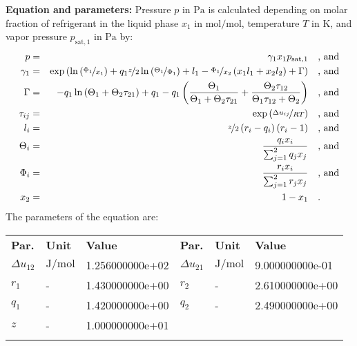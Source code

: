 \textbf{Equation and parameters:}
\newline
%
Pressure $p$ in $\si{\pascal}$ is calculated depending on molar fraction of refrigerant in the liquid phase $x_1$ in $\si{\mole\per\mole}$, temperature $T$ in $\si{\kelvin}$, and vapor pressure $p_\mathrm{sat,1}$ in $\si{\pascal}$ by:
%
\begin{equation*}
\begin{split}
p &=& \gamma_1 x_1 p_\mathrm{sat,1} & \quad\text{, and} \\
\gamma_1 &=& \exp \left( \ln \left( \nicefrac{\Phi_1}{x_1} \right) + q_1 \nicefrac{z}{2} \ln \left( \nicefrac{\Theta_1}{\Phi_1} \right) + l_1 - \nicefrac{\Phi_1}{x_2} \left( x_1 l_1 + x_2 l_2 \right) + \Gamma \right) & \quad\text{, and} \\
\Gamma &=& - q_1 \ln \left( \Theta_1 + \Theta_2 \tau_{21} \right) + q_1 - q_1 \left( \frac{\Theta_1}{\Theta_1 + \Theta_2 \tau_{21}} + \frac{\Theta_2 \tau_{12}}{\Theta_1 \tau_{12} + \Theta_2} \right) & \quad\text{, and} \\
\tau_{ij} &=& \exp \left( \nicefrac{\Delta u_{ij}}{R T} \right) & \quad\text{, and} \\
l_i &=& \nicefrac{z}{2} \left( r_i - q_i \right) \left(r_i - 1 \right) & \quad\text{, and} \\
\Theta_i &=& \frac{q_i x_i}{\sum_{j=1}^{2} q_j x_j} & \quad\text{, and} \\
\Phi_i &=& \frac{r_i x_i}{\sum_{j=1}^{2} r_j x_j} & \quad\text{, and} \\
x_2 &=& 1 - x_1  & \quad\text{.} \\
\end{split}
\end{equation*}
%
The parameters of the equation are:
%
\begin{longtable}[l]{lll|lll}
\toprule
\addlinespace
\textbf{Par.} & \textbf{Unit} & \textbf{Value} &	\textbf{Par.} & \textbf{Unit} & \textbf{Value} \\
\addlinespace
\midrule
\endhead

\bottomrule
\endfoot
\bottomrule
\endlastfoot
\addlinespace

$\Delta u_{12}$ & $\si{\joule\per\mole}$ & 1.256000000e+02 & $\Delta u_{21}$ & $\si{\joule\per\mole}$ & 9.000000000e-01 \\
$r_{1}$ & - & 1.430000000e+00 & $r_{2}$ & - & 2.610000000e+00 \\
$q_{1}$ & - & 1.420000000e+00 & $q_{2}$ & - & 2.490000000e+00 \\
$z$ & - & 1.000000000e+01 & & &  \\

\addlinespace\end{longtable}


